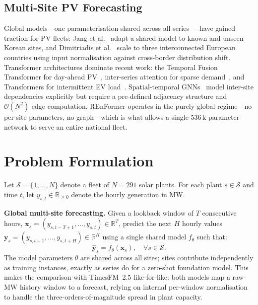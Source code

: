 \documentclass[10pt,twocolumn]{article}
\begin{document}
\subsection{Multi-Site PV Forecasting}

Global models---one parameterisation shared across all
series~\cite{torres2019bigdata}---have gained traction for PV fleets:
Jang et al.~\cite{jang2024multisite} adapt a shared model to known and
unseen Korean sites, and Dimitriadis et
al.~\cite{dimitriadis2025multicountry} scale to three interconnected
European countries using input normalisation against cross-border
distribution shift. Transformer architectures dominate recent work: the
Temporal Fusion Transformer for day-ahead PV~\cite{lopezSantos2022tft},
inter-series attention for sparse demand~\cite{cristian2024interseries},
and Transformers for intermittent EV load~\cite{koohfar2023ev}.
Spatial-temporal GNNs~\cite{bai2023graphgru,yang2025destgnn,bai2025dma}
model inter-site dependencies explicitly but require a pre-defined
adjacency structure and $\mathcal{O}(N^2)$ edge computation. REnFormer
operates in the purely global regime---no per-site parameters, no
graph---which is what allows a single 536\,k-parameter network to serve
an entire national fleet.

\section{Problem Formulation}

Let $\mathcal{S} = \{1, \ldots, N\}$ denote a fleet of $N = 291$ solar
plants. For each plant $s \in \mathcal{S}$ and time $t$, let $y_{s,t} \in
\mathbb{R}_{\geq 0}$ denote the hourly generation in MW.

\textbf{Global multi-site forecasting.}
Given a lookback window of $T$ consecutive hours,
$\mathbf{x}_s = (y_{s,t-T+1}, \ldots, y_{s,t}) \in \mathbb{R}^T$,
predict the next $H$ hourly values
$\mathbf{y}_s = (y_{s,t+1}, \ldots, y_{s,t+H}) \in \mathbb{R}^H$
using a single shared model $f_\theta$ such that:
\begin{equation}
  \hat{\mathbf{y}}_s = f_\theta(\mathbf{x}_s), \quad \forall s \in \mathcal{S}.
\end{equation}
The model parameters $\theta$ are shared across all sites; sites
contribute independently as training instances, exactly as series do for
a zero-shot foundation model. This makes the comparison with
TimesFM~2.5 like-for-like: both models map a raw-MW history window to a
forecast, relying on internal per-window normalisation to handle the
three-orders-of-magnitude spread in plant capacity.
\end{document}
